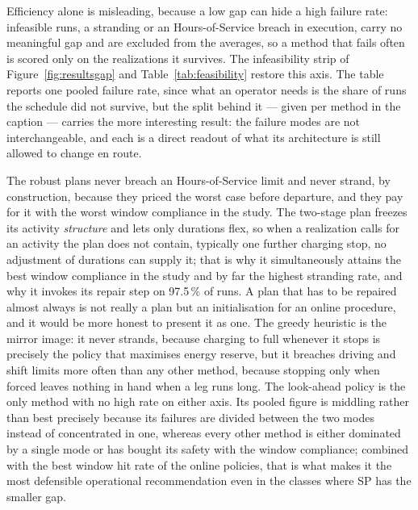 Efficiency alone is misleading, because a low gap can hide a high failure rate: infeasible runs, a stranding or an Hours-of-Service breach in execution, carry no meaningful gap and are excluded from the averages, so a method that fails often is scored only on the realizations it survives. The infeasibility strip of Figure~\ref{fig:resultsgap} and Table~\ref{tab:feasibility} restore this axis. The table reports one pooled failure rate, since what an operator needs is the share of runs the schedule did not survive, but the split behind it --- given per method in the caption --- carries the more interesting result: the failure modes are not interchangeable, and each is a direct readout of what its architecture is still allowed to change en route.

The robust plans never breach an Hours-of-Service limit and never strand, by construction, because they priced the worst case before departure, and they pay for it with the worst window compliance in the study. The two-stage plan freezes its activity \emph{structure} and lets only durations flex, so when a realization calls for an activity the plan does not contain, typically one further charging stop, no adjustment of durations can supply it; that is why it simultaneously attains the best window compliance in the study and by far the highest stranding rate, and why it invokes its repair step on 97.5\,\% of runs. A plan that has to be repaired almost always is not really a plan but an initialisation for an online procedure, and it would be more honest to present it as one. The greedy heuristic is the mirror image: it never strands, because charging to full whenever it stops is precisely the policy that maximises energy reserve, but it breaches driving and shift limits more often than any other method, because stopping only when forced leaves nothing in hand when a leg runs long. The look-ahead policy is the only method with no high rate on either axis. Its pooled figure is middling rather than best precisely because its failures are divided between the two modes instead of concentrated in one, whereas every other method is either dominated by a single mode or has bought its safety with the window compliance; combined with the best window hit rate of the online policies, that is what makes it the most defensible operational recommendation even in the classes where SP has the smaller gap.

